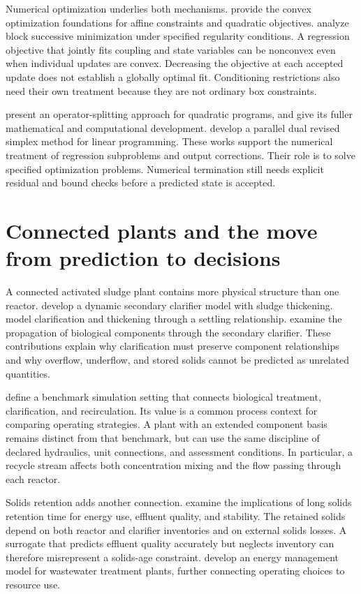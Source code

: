 Numerical optimization underlies both mechanisms. \citet{Boyd2004} provide the convex optimization foundations for affine constraints and quadratic objectives. \citet{Razaviyayn2013} analyze block successive minimization under specified regularity conditions. A regression objective that jointly fits coupling and state variables can be nonconvex even when individual updates are convex. Decreasing the objective at each accepted update does not establish a globally optimal fit. Conditioning restrictions also need their own treatment because they are not ordinary box constraints.

\citet{Stellato2018} present an operator-splitting approach for quadratic programs, and \citet{Stellato2020} give its fuller mathematical and computational development. \citet{HuangfuHall2018} develop a parallel dual revised simplex method for linear programming. These works support the numerical treatment of regression subproblems and output corrections. Their role is to solve specified optimization problems. Numerical termination still needs explicit residual and bound checks before a predicted state is accepted.

\section{Connected plants and the move from prediction to decisions}

A connected activated sludge plant contains more physical structure than one reactor. \citet{HartelPopel1992} develop a dynamic secondary clarifier model with sludge thickening. \citet{Takacs1991} model clarification and thickening through a settling relationship. \citet{JeppssonDiehl1996} examine the propagation of biological components through the secondary clarifier. These contributions explain why clarification must preserve component relationships and why overflow, underflow, and stored solids cannot be predicted as unrelated quantities.

\citet{Alex2008} define a benchmark simulation setting that connects biological treatment, clarification, and recirculation. Its value is a common process context for comparing operating strategies. A plant with an extended component basis remains distinct from that benchmark, but can use the same discipline of declared hydraulics, unit connections, and assessment conditions. In particular, a recycle stream affects both concentration mixing and the flow passing through each reactor.

Solids retention adds another connection. \citet{Leu2012} examine the implications of long solids retention time for energy use, effluent quality, and stability. The retained solids depend on both reactor and clarifier inventories and on external solids losses. A surrogate that predicts effluent quality accurately but neglects inventory can therefore misrepresent a solids-age constraint. \citet{Miederer2025} develop an energy management model for wastewater treatment plants, further connecting operating choices to resource use.

